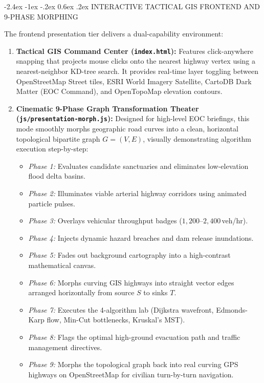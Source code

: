 \documentclass[12pt,oneside]{report}
\makeatletter
\renewcommand{\section}{\@startsection{section}{1}{\z@}%
  {-2.4ex \@plus -1ex \@minus -.2ex}%
  {0.6ex \@plus .2ex}%
  {\normalfont\large\bfseries}}
\makeatother
\begin{document}
\section{INTERACTIVE TACTICAL GIS FRONTEND AND 9-PHASE MORPHING}

The frontend presentation tier delivers a dual-capability environment:

\begin{enumerate}
    \item \textbf{Tactical GIS Command Center (\texttt{index.html}):} Features click-anywhere snapping that projects mouse clicks onto the nearest highway vertex using a nearest-neighbor KD-tree search. It provides real-time layer toggling between OpenStreetMap Street tiles, ESRI World Imagery Satellite, CartoDB Dark Matter (EOC Command), and OpenTopoMap elevation contours.
    
    \item \textbf{Cinematic 9-Phase Graph Transformation Theater (\texttt{js/presentation-morph.js}):} Designed for high-level EOC briefings, this mode smoothly morphs geographic road curves into a clean, horizontal topological bipartite graph $G = (V, E)$, visually demonstrating algorithm execution step-by-step:
    \begin{itemize}
        \item \textit{Phase 1:} Evaluates candidate sanctuaries and eliminates low-elevation flood delta basins.
        \item \textit{Phase 2:} Illuminates viable arterial highway corridors using animated particle pulses.
        \item \textit{Phase 3:} Overlays vehicular throughput badges ($1,200$--$2,400$\,veh/hr).
        \item \textit{Phase 4:} Injects dynamic hazard breaches and dam release inundations.
        \item \textit{Phase 5:} Fades out background cartography into a high-contrast mathematical canvas.
        \item \textit{Phase 6:} Morphs curving GIS highways into straight vector edges arranged horizontally from source $S$ to sinks $T$.
        \item \textit{Phase 7:} Executes the 4-algorithm lab (Dijkstra wavefront, Edmonds-Karp flow, Min-Cut bottlenecks, Kruskal's MST).
        \item \textit{Phase 8:} Flags the optimal high-ground evacuation path and traffic management directives.
        \item \textit{Phase 9:} Morphs the topological graph back into real curving GPS highways on OpenStreetMap for civilian turn-by-turn navigation.
    \end{itemize}
\end{enumerate}
\end{document}
